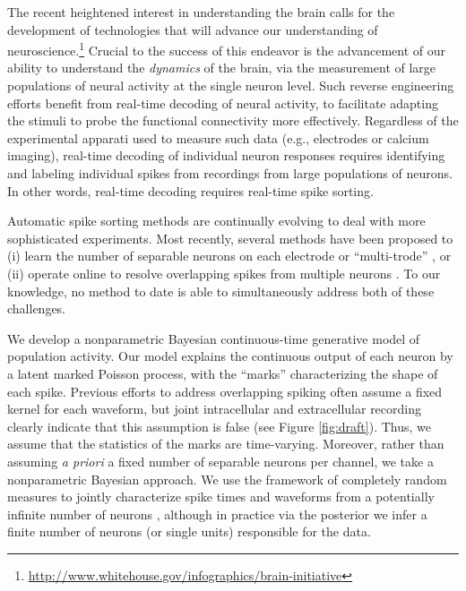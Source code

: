 
The recent heightened interest in understanding the brain calls for the development of technologies that will advance our understanding of neuroscience.\footnote{\url{http://www.whitehouse.gov/infographics/brain-initiative}}  Crucial to the success of this endeavor is the advancement of our ability to understand the \emph{dynamics} of the brain, via the measurement of large populations of neural activity at the single neuron level.  Such reverse engineering efforts  benefit from real-time decoding of neural activity, to facilitate adapting the stimuli to probe the functional connectivity more effectively.  Regardless of the experimental apparati used to measure such data (e.g., electrodes or calcium imaging), real-time decoding of individual neuron responses requires identifying and labeling individual spikes from recordings from large populations of neurons.
In other words, real-time decoding requires real-time spike sorting.

Automatic spike sorting methods are continually evolving to deal with more sophisticated experiments.  Most recently, several methods have been proposed to (i) learn the number of separable neurons on each electrode or ``multi-trode'' \cite{??}, or (ii) operate online to resolve overlapping spikes from multiple neurons \cite{??}.   To our knowledge, no method to date is able to simultaneously address both of these challenges.  

We develop a nonparametric Bayesian continuous-time generative model of population activity.  Our model explains the continuous output of each neuron
by a latent marked Poisson process, with the ``marks'' characterizing the shape of each spike.  Previous efforts to address overlapping spiking often assume a fixed kernel for each waveform, but joint intracellular and extracellular recording clearly indicate that this assumption is false (see Figure \ref{fig:draft}). Thus, we assume that the statistics of the marks are time-varying.  Moreover, rather than assuming \emph{a priori} a fixed number of separable neurons per channel, we take a nonparametric Bayesian approach.  We use the framework of completely random measures to jointly characterize spike times and waveforms from 
a potentially infinite number of neurons \cite{??}, although in practice via the posterior we infer a finite number of neurons (or single units) responsible for the data.  

